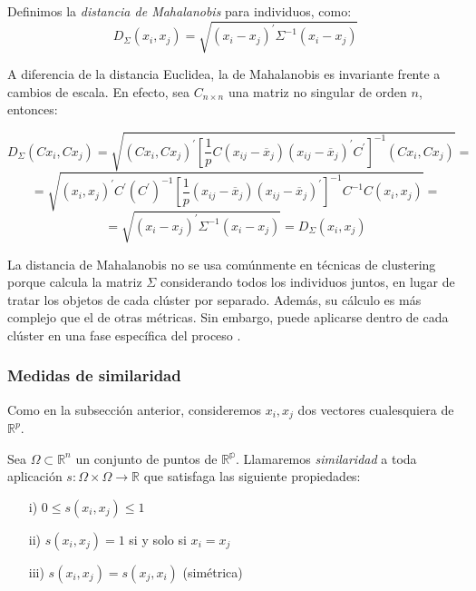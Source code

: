 \begin{definicion}
    Definimos la \textit{distancia de Mahalanobis} para individuos, como:
    \[
    D_{\Sigma}(x_{i},x_{j}) = \sqrt{(x_{i}-x_{j})^{'}\Sigma^{-1}(x_{i}-x_{j})}
    \]
\end{definicion}

A diferencia de la distancia Euclidea, la de Mahalanobis es invariante frente a cambios de escala. En efecto, sea $C_{n\times n}$ una matriz no singular
de orden $n$, entonces:

\[
D_{\Sigma}(Cx_{i},Cx_{j}) = \sqrt{(Cx_{i},Cx_{j})^{'}[\frac{1}{p}C(x_{ij}-\overline{x}_{j})(x_{ij}-\overline{x}_{j})^{'}C^{'}]^{-1}(Cx_{i},Cx_{j})} = 
\]
\[
= \sqrt{(x_{i},x_{j})^{'}C^{'}(C^{'})^{-1}[\frac{1}{p}(x_{ij}-\overline{x}_{j})(x_{ij}-\overline{x}_{j})^{'}]^{-1}C^{-1}C(x_{i},x_{j})} = 
\]    
\[
= \sqrt{(x_{i}-x_{j})^{'}\Sigma^{-1}(x_{i}-x_{j})} = D_{\Sigma}(x_{i},x_{j})
\]

La distancia de Mahalanobis no se usa comúnmente en técnicas de clustering porque calcula la matriz $\Sigma$ considerando todos los individuos juntos, en lugar 
de tratar los objetos de cada clúster por separado. Además, su cálculo es más complejo que el de otras métricas. Sin embargo, puede aplicarse dentro de 
cada clúster en una fase específica del proceso \cite{cluster-mahalanobis}.


\subsubsection{Medidas de similaridad}

Como en la subsección anterior, consideremos $x_{i},x_{j}$ dos vectores cualesquiera de $\mathbb{R}^{p}$. \newline

\begin{definicion}
Sea $\Omega \subset{\mathbb{R}^{n}}$ un conjunto de puntos de $\mathbb{R^{p}}$. Llamaremos \textit{similaridad} a toda aplicación $s:\Omega \times \Omega \rightarrow \mathbb{R}$
que satisfaga las siguiente propiedades:

\begin{itemize}
    \item[i)] $0 \leq s(x_{i},x_{j}) \leq 1$
    \item[ii)]$s(x_{i},x_{j}) = 1$ si y solo si $x_{i} = x_{j}$
    \item[iii)] $s(x_{i},x_{j}) = s(x_{j},x_{i})$ (simétrica)
\end{itemize}
\end{definicion}

